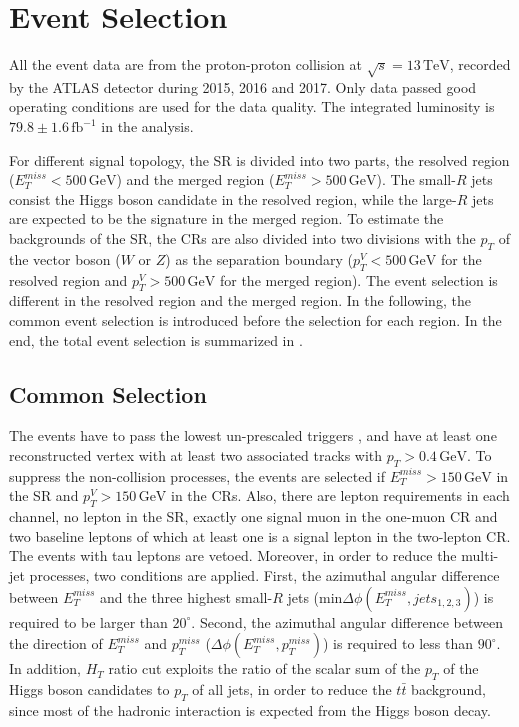 \documentclass[class=NTHU_thesis, crop=false]{standalone}
\begin{document}
\chapter{Event Selection}
\label{chap:event_selection}
All the event data are from the proton-proton collision at $\sqrt{s} = 13\, \mathrm{TeV}$, recorded by the ATLAS detector during 2015, 2016 and 2017. Only data passed good operating conditions are used for the data quality. The integrated luminosity is $79.8 \pm 1.6\, \mathrm{fb}^{-1}$ in the analysis.

For different signal topology, the SR is divided into two parts, the resolved region ($E^{miss}_T < 500\, \mathrm{GeV}$) and the merged region ($E^{miss}_T > 500\, \mathrm{GeV}$). The small-$R$ jets consist the Higgs boson candidate in the resolved region, while the large-$R$ jets are expected to be the signature in the merged region. To estimate the backgrounds of the SR, the CRs are also divided into two divisions with the $p_T$ of the vector boson ($W$ or $Z$) as the separation boundary ($p^V_T < 500\, \mathrm{GeV}$ for the resolved region and $p^V_T > 500\, \mathrm{GeV}$ for the merged region). The event selection is different in the resolved region and the merged region. In the following, the common event selection is introduced before the selection for each region. In the end, the total event selection is summarized in .

\section{Common Selection}
The events have to pass the lowest un-prescaled triggers \cite{1748-0221-3-08-S08003}, and have at least one reconstructed vertex with at least two associated tracks with $p_T > 0.4\, \mathrm{GeV}$. To suppress the non-collision processes, the events are selected if $E^{miss}_T > 150\, \mathrm{GeV}$ in the SR and $p^V_T > 150\, \mathrm{GeV}$ in the CRs. Also, there are lepton requirements in each channel, no lepton in the SR, exactly one signal muon in the one-muon CR and two baseline leptons of which at least one is a signal lepton in the two-lepton CR. The events with tau leptons are vetoed. Moreover, in order to reduce the multi-jet processes, two conditions are applied. First, the azimuthal angular difference between $E^{miss}_T$ and the three highest small-$R$ jets (min$\Delta\phi(E^{miss}_T, jets_{1, 2, 3})$) is required to be larger than $20^\circ$. Second, the azimuthal angular difference between the direction of $E^{miss}_T$ and $p^{miss}_T$ ($\Delta\phi(E^{miss}_T, p^{miss}_T)$) is required to less than $90^\circ$. In addition, $H_T$ ratio cut \cite{PhysRevLett.119.181804} exploits the ratio of the scalar sum of the $p_T$ of the Higgs boson candidates to $p_T$ of all jets, in order to reduce the $t\bar{t}$ background, since most of the hadronic interaction is expected from the Higgs boson decay.
\end{document}
